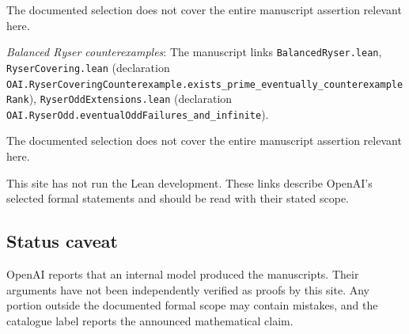 \documentclass[11pt]{article}
\begin{document}
The documented selection does not cover the entire manuscript assertion relevant here.

\textit{Balanced Ryser counterexamples}: The manuscript links \texttt{BalancedRyser.lean}, \texttt{RyserCovering.lean} (declaration \texttt{OAI.RyserCoveringCounterexample.exists\_prime\_eventually\_counterexampleRank}), \texttt{RyserOddExtensions.lean} (declaration \texttt{OAI.RyserOdd.eventualOddFailures\_and\_infinite}).

The documented selection does not cover the entire manuscript assertion relevant here.

This site has not run the Lean development. These links describe OpenAI’s selected formal statements and should be read with their stated scope.

\subsection{Status caveat}
OpenAI reports that an internal model produced the manuscripts. Their arguments have not been independently verified as proofs by this site. Any portion outside the documented formal scope may contain mistakes, and the catalogue label reports the announced mathematical claim.
\end{document}
